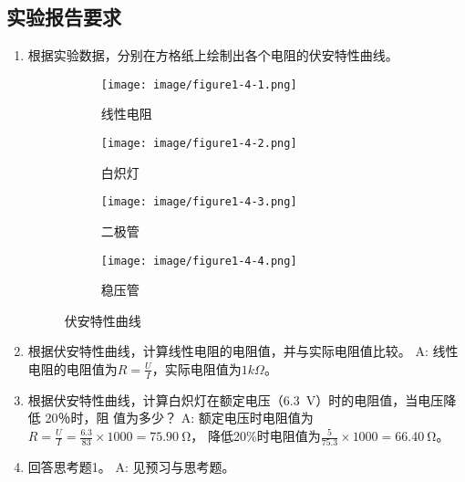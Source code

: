 \documentclass[UTF8]{article}
\begin{document}
        \subsection{实验报告要求}
            \begin{enumerate}[label=\textbf{\arabic*}.]
                \item 根据实验数据，分别在方格纸上绘制出各个电阻的伏安特性曲线。
                \begin{figure}[H]
                    \centering
                    \begin{subfigure}[H]{0.45\textwidth}
                        \centering
                        \texttt{[image: image/figure1-4-1.png]}
                        \caption{线性电阻}
                    \end{subfigure}
                    \hfill
                    \begin{subfigure}[H]{0.45\textwidth}
                        \centering
                        \texttt{[image: image/figure1-4-2.png]}
                        \caption{白炽灯}
                    \end{subfigure}
                    \hfill
                    \begin{subfigure}[H]{0.45\textwidth}
                        \centering
                        \texttt{[image: image/figure1-4-3.png]}
                        \caption{二极管}
                        
                    \end{subfigure}
                    \hfill
                    \begin{subfigure}[H]{0.45\textwidth}
                        \centering
                        \texttt{[image: image/figure1-4-4.png]}
                        \caption{稳压管}
                    \end{subfigure}
                    \caption{伏安特性曲线}
                \end{figure}
                
                \item 根据伏安特性曲线，计算线性电阻的电阻值，并与实际电阻值比较。\newline
                A: 线性电阻的电阻值为$R = \frac{U}{I}$，实际电阻值为$1k\Omega$。
                \item 根据伏安特性曲线，计算白炽灯在额定电压（\SI{6.3}{V}）时的电阻值，当电压降低 20％时，阻
                值为多少？ 
                A: 额定电压时电阻值为$R = \frac{U}{I} = \frac{6.3}{83} \times 1000 = \SI{75.90}{\ohm}$，
                降低20\%时电阻值为$\frac{5}{75.3} \times 1000 = \SI{66.40}{\ohm}$。
                \item 回答思考题1。\newline
                A: 见预习与思考题。
            \end{enumerate}
\end{document}
